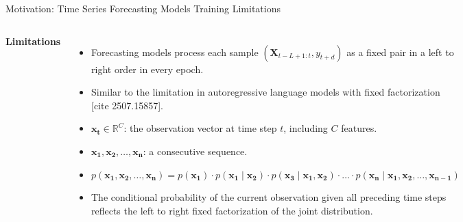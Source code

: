 \documentclass[aspectratio=169,10pt]{beamer}
\begin{document}
\begin{frame}{Motivation: Time Series Forecasting Models Training Limitations}
\begin{columns}[T]
  \textbf{Limitations}
  \begin{itemize}
        \item Forecasting models process each sample $(\mathbf{X}_{t-L+1 : t}, y_{t+d})$ as a fixed pair in a left to right order in every epoch.
        \item Similar to the limitation in autoregressive language models with fixed factorization [cite 2507.15857].
        \item $\mathbf{x_t} \in \mathbb{R}^{C}$: the observation vector at time step $t$, including  $C$ features.
        \item $\mathbf{x_1}, \mathbf{x_2}, \ldots, \mathbf{x_n}$: a consecutive sequence.
        \item $p(\mathbf{x_1}, \mathbf{x_2}, \ldots, \mathbf{x_n}) = p(\mathbf{x_1})\cdot p(\mathbf{x_1} \mid \mathbf{x_2}) \cdot p(\mathbf{x_3} \mid \mathbf{x_1},\mathbf{x_2})\cdot \ldots \cdot p(\mathbf{x_n} \mid \mathbf{x_1}, \mathbf{x_2}, \ldots, \mathbf{x_{n-1}})$
        \item The conditional probability of the current observation given all preceding time steps reflects the left to right fixed factorization of the joint distribution.

      \end{itemize}
  \vspace{0.5em}

  \end{columns}
\end{frame}
\end{document}
